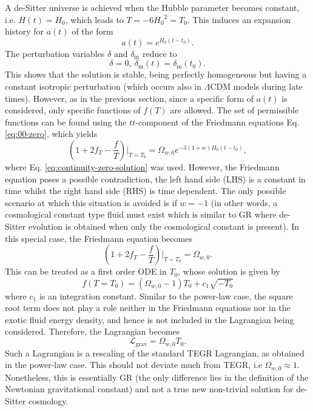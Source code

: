 \documentclass[prl,floatfix,showpacs,twocolumn,preprintnumbers,amsmath,amssymb,superscriptaddress]{revtex4}
\begin{document}
A de-Sitter universe is achieved when the Hubble parameter becomes constant, i.e. $H(t) = H_0$, which leads to $T = -6 {H_0}^2 = T_0$. This induces an expansion history for $a(t)$ of the form
\begin{equation}
a(t) = e^{H_0 \left(t-t_0\right)}.
\end{equation}
The perturbation variables $\delta$ and $\delta_{\text{m}}$ reduce to
\begin{equation}
\delta = 0, \: \delta_{\text{m}}(t) = \delta_{\text{m}}\left(t_0\right).
\end{equation}
This shows that the solution is stable, being perfectly homogeneous but having a constant isotropic perturbation (which occurs also in $\Lambda$CDM models during late times). However, as in the previous section, since a specific form of $a(t)$ is considered, only specific functions of $f(T)$ are allowed. The set of permissible functions can be found using the $tt$-component of the Friedmann equations Eq. \eqref{eq:00-zero}, which yields
\begin{equation}
\left(1+2f_T-\dfrac{f}{T}\right)\bigg|_{T = T_0} = \Omega_{w,0} e^{-3(1+w)H_0 \left(t-t_0\right)},
\end{equation}
where  Eq. \eqref{eq:continuity-zero-solution} was used. However, the Friedmann equation poses a possible contradiction, the left hand side (LHS) is a constant in time whilst the right hand side (RHS) is time dependent. The only possible scenario at which this situation is avoided is if $w = -1$ (in other words, a cosmological constant type fluid must exist which is similar to GR where de-Sitter evolution is obtained when only the cosmological constant is present). In this special case, the Friedmann equation becomes
\begin{equation}
\left(1+2f_T-\dfrac{f}{T}\right)\bigg|_{T = T_0} = \Omega_{w,0}. 
\end{equation}
This can be treated as a first order ODE in $T_0$, whose solution is given by
\begin{equation}
f\left(T=T_0\right) = \left(\Omega_{w,0}-1\right) T_0 + c_1 \sqrt{-T_0}
\end{equation}
where $c_1$ is an integration constant. Similar to the power-law case, the square root term does not play a role neither in the Friedmann equations nor in the exotic fluid energy density, and hence is not included in the Lagrangian being considered. Therefore, the Lagrangian becomes
\begin{equation}
\mathcal{L}_{\text{grav}} = \Omega_{w,0} T_0.
\end{equation}
Such a Lagrangian is a rescaling of the standard TEGR Lagrangian, as obtained in the power-law case. This should not deviate much from TEGR, i.e $\Omega_{w,0} \approx 1$. Nonetheless, this is essentially GR (the only difference lies in the definition of the Newtonian gravitational constant) and not a true new non-trivial solution for de-Sitter cosmology. 
\end{document}
